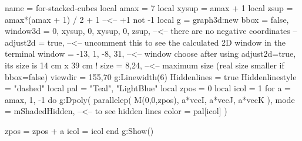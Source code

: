 \documentclass[border=2 mm]{standalone}
\begin{document}
\begin{luadraw}{name = for-stacked-cubes}
local amax = 7
local xysup = amax + 1
local zsup  = amax*(amax + 1) / 2 + 1 --<-- +1 not -1
local g = graph3d:new{
  bbox     = false,
  window3d = {0, xysup, 0, xysup, 0, zsup}, --<-- there are no negative coordinates
  --adjust2d = true, --<-- uncomment this to see the calculated 2D window in the terminal
  window   = {-13, 1, -8, 31}, --<-- window choose after using adjust2d=true, its size is 14 cm x 39 cm !
  size = {8,24},  --<-- maximum size (real size smaller if bbox=false)
  viewdir  = {155,70}
}
g:Linewidth(6)
Hiddenlines     = true
Hiddenlinestyle = "dashed"
local pal = {"Teal", "LightBlue"}
local zpos = 0
local icol = 1
for a = amax, 1, -1 do 
  g:Dpoly(
    parallelep(
      M(0,0,zpos),
      a*vecI, a*vecJ, a*vecK
    ),
    {
     mode = mShadedHidden, --<-- to see hidden lines
      color = pal[icol]
    }
  )
  
  zpos = zpos + a
  icol = icol %
end
g:Show()
\end{luadraw}
\end{document}
